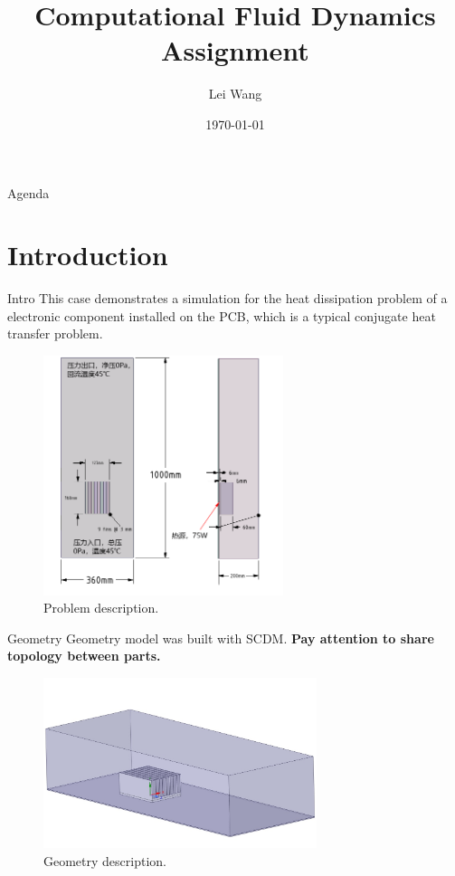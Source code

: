 \documentclass[10pt, xcolor=table]{beamer}
\title[CFD assignment] {Computational Fluid Dynamics Assignment}
\author[Lei, Wang]{Lei Wang}
\institute[Master Student] {School of Mechanical Engineering and Automation
}
\date{\today}
\begin{document}
%
\begin{frame}[plain]
	\titlepage
\end{frame}
%
\begin{frame}{Agenda}
	\tableofcontents
\end{frame}
%
%
\section{Introduction}
\begin{frame}{Intro}
	This case demonstrates a simulation for the heat dissipation  problem of a electronic component  installed on the PCB, which is a typical conjugate heat transfer problem.
	\\ 
	\vfill

	\begin{figure}
		\includegraphics[height=7cm]{figure2.png}
		\caption{Problem description.}
	\end{figure}

	\vfill
\end{frame}
%
\begin{frame}{Geometry}
	Geometry model was built with SCDM. \textbf{Pay attention to share topology between parts.}
	\vfill
	\begin{figure}
		\includegraphics[width=8cm]{figure1.jpg}
		\caption{Geometry description.}
	\end{figure}	
\end{frame}
\end{document}
